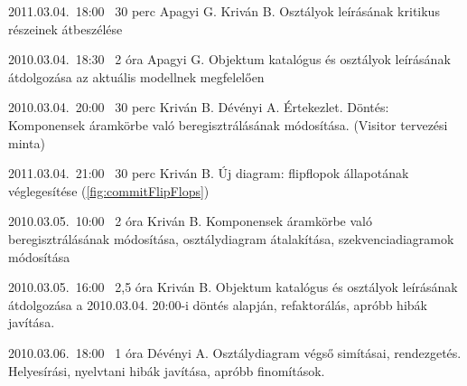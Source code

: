 \begin{naplo}
\bejegyzes
{2011.03.04.~18:00~} %
{30 perc} %
{Apagyi G.\newline
Kriván B.} %
{Osztályok leírásának kritikus részeinek átbeszélése} %

\bejegyzes
{2010.03.04.~18:30~}
{2 óra}
{Apagyi G.}
{Objektum katalógus és osztályok leírásának átdolgozása az aktuális modellnek megfelelően}

\bejegyzes
{2010.03.04.~20:00~}
{30 perc}
{Kriván B.\newline
Dévényi A.}
{Értekezlet.\newline
Döntés: Komponensek áramkörbe való beregisztrálásának módosítása. (Visitor tervezési minta)}

\bejegyzes
{2011.03.04.~21:00~} %
{30 perc} %
{Kriván B.} %
{Új diagram: flipflopok állapotának véglegesítése (\ref{fig:commitFlipFlops})} %

\bejegyzes
{2010.03.05.~10:00~}
{2 óra}
{Kriván B.}
{Komponensek áramkörbe való beregisztrálásának módosítása, osztálydiagram átalakítása, szekvenciadiagramok módosítása}

\bejegyzes
{2010.03.05.~16:00~}
{2,5 óra}
{Kriván B.}
{Objektum katalógus és osztályok leírásának átdolgozása a 2010.03.04. 20:00-i döntés alapján, refaktorálás, apróbb hibák javítása.}

\bejegyzes
{2010.03.06.~18:00~}
{1 óra}
{Dévényi A.}
{Osztálydiagram végső simításai, rendezgetés. Helyesírási, nyelvtani hibák javítása, apróbb finomítások.}

\end{naplo}
